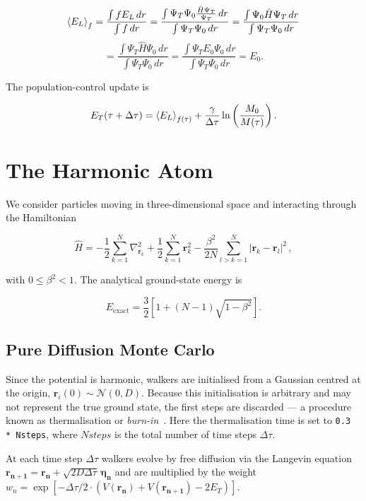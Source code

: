 \documentclass[11pt,a4paper,twoside,pdf]{article}
\numberwithin{equation}{section}
\begin{document}
$$
    \braket{E_L}_{f} = \frac{\int f E_L\, dr}{\int f\, dr} = \frac{ \int \Psi_T \Psi_0 \frac{\hat{H} \Psi_T }{\Psi_T}\, dr}{ \int \Psi_T \Psi_0\, dr }
    = \frac{ \int \Psi_0 \hat{H} \Psi_T\, dr}{  \int \Psi_T \Psi_0\, dr }
$$
$$
    = \frac{ \int \Psi_T \hat{H} \Psi_0\, dr}{  \int \Psi_T \Psi_0\, dr } = \frac{ \int \Psi_T E_0 \Psi_0\, dr}{  \int \Psi_T \Psi_0\, dr } = E_0.
$$

The population-control update is

$$E_T(\tau + \Delta \tau) = \braket{E_L}_{f(\tau)} + \frac{\gamma}{\Delta \tau} \ln \left( \frac{M_0}{M(\tau)} \right).$$


\section{The Harmonic Atom}

We consider particles moving in three-dimensional space and interacting through
the Hamiltonian

\begin{equation}
    \hat{H} = -\frac{1}{2} \sum_{k=1}^N \nabla_{\mathbf{r}_k}^2
    + \frac{1}{2} \sum_{k=1}^N \mathbf{r}_k^2  -\frac{\beta^2}{2N} \sum_{l>k=1}^N |\mathbf{r}_{k} - \mathbf{r}_l|^2 \,,
\label{hamiltonianoatomoarmonico}
\end{equation}

with $0 \leq \beta^2 <1$. The analytical ground-state energy is~\cite{armstrong2012quantum}

\begin{equation}
    E_{\mathrm{exact}} = \frac{3}{2} \left[ 1 + (N-1) \sqrt{1 - \beta^2}\right].
\label{Eexact}
\end{equation}


\subsection{Pure Diffusion Monte Carlo}

Since the potential is harmonic, walkers are initialised from a Gaussian centred
at the origin, $\mathbf r_i(0)\sim \mathcal N(0, D)$. Because this initialisation is
arbitrary and may not represent the true ground state, the first steps are discarded
— a procedure known as thermalisation or \textit{burn-in}~\cite{newman1999monte}.
Here the thermalisation time is set to \texttt{0.3\,*\,Nsteps}, where $Nsteps$ is
the total number of time steps $\Delta \tau$.

At each time step $\Delta\tau$ walkers evolve by free diffusion via the Langevin
equation $\mathbf{r_{n+1}} = \mathbf{r_n} + \sqrt{2D\Delta \tau}\,\boldsymbol{\eta_n}$
and are multiplied by the weight
$w_n = \exp \left[ - \Delta \tau / 2 \cdot ( V(\mathbf{r_n}) + V(\mathbf{r_{n+1}})- 2E_T) \right]$.
\end{document}
